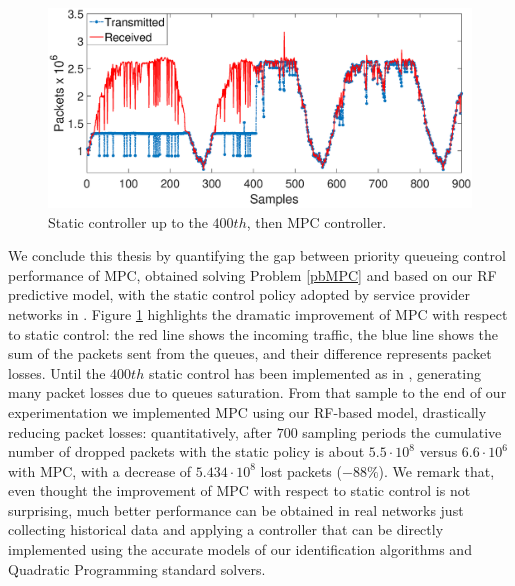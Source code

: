 \begin{figure}[h!]
\centering
\includegraphics[trim={120 0 120 0},width=0.9\linewidth]{figure/MPCfinal.eps}
\caption{Static controller up to the $400th$, then MPC controller.}
\label{fig:{MPC}}
\end{figure}

We conclude this thesis by quantifying the gap between priority queueing control performance of MPC, obtained solving Problem \ref{pbMPC} and based on our RF predictive model, with the static control policy adopted by service provider networks in \cite{Notiziario}. Figure \ref{fig:{MPC}} highlights the dramatic improvement of MPC with respect to static control: the red line shows the incoming traffic, the blue line shows the sum of the packets sent from the queues, and their difference represents packet losses. Until the $400th$ static control has been implemented as in \cite{Notiziario}, generating many packet losses due to queues saturation. From that sample to the end of our experimentation we implemented MPC using our RF-based model, drastically reducing packet losses: quantitatively, after $700$ sampling periods the cumulative number of dropped packets with the static policy is about $5.5\cdot10^8$ versus $6.6\cdot10^6$ with MPC, with a decrease of $5.434\cdot10^8$ lost packets ($-88 \%$).
We remark that, even thought the improvement of MPC with respect to static control is not surprising, much better performance can be obtained in real networks just collecting historical data and applying a controller that can be directly implemented using the accurate models of our identification algorithms and Quadratic Programming standard solvers.